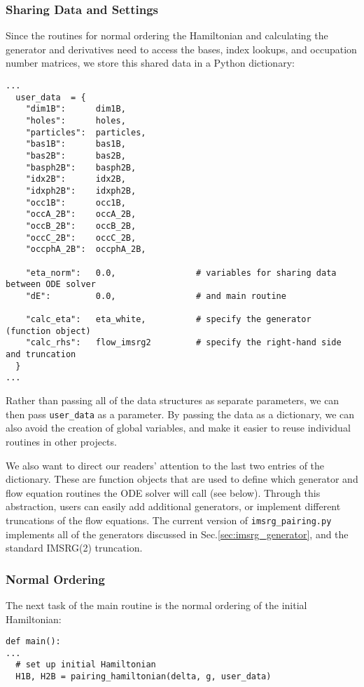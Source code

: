 {\subsubsection*{Sharing Data and Settings}
Since the routines for normal ordering the Hamiltonian and calculating 
the generator and derivatives need to access the bases, index lookups,
and occupation number matrices, we store this shared data in a Python
dictionary:

\begin{lstlisting}
...
  user_data  = {
    "dim1B":      dim1B, 
    "holes":      holes,
    "particles":  particles,
    "bas1B":      bas1B,
    "bas2B":      bas2B,
    "basph2B":    basph2B,
    "idx2B":      idx2B,
    "idxph2B":    idxph2B,
    "occ1B":      occ1B,
    "occA_2B":    occA_2B,
    "occB_2B":    occB_2B,
    "occC_2B":    occC_2B,
    "occphA_2B":  occphA_2B,

    "eta_norm":   0.0,                # variables for sharing data between ODE solver
    "dE":         0.0,                # and main routine
    
    "calc_eta":   eta_white,          # specify the generator (function object)
    "calc_rhs":   flow_imsrg2         # specify the right-hand side and truncation
  }
...
\end{lstlisting}

Rather than passing all of the data structures as separate parameters, we
can then pass \texttt{user\_data} as a parameter. By passing the data as a
dictionary, we can also avoid the creation of global variables, and make
it easier to reuse individual routines in other projects.

We also want to direct our readers' attention to the last two entries of
the dictionary. These are function objects that are used to define which
generator and flow equation routines the ODE solver will call (see below).
Through this abstraction, users can easily add additional generators, or
implement different truncations of the flow equations. The current version
of \texttt{imsrg\_pairing.py} implements all of the generators discussed
in Sec.\ref{sec:imsrg_generator}, and the standard IMSRG(2) truncation.

\subsubsection*{Normal Ordering}
The next task of the main routine is the normal ordering of the initial
Hamiltonian: 
\begin{lstlisting}
def main():
...
  # set up initial Hamiltonian
  H1B, H2B = pairing_hamiltonian(delta, g, user_data)


\end{lstlisting}}
